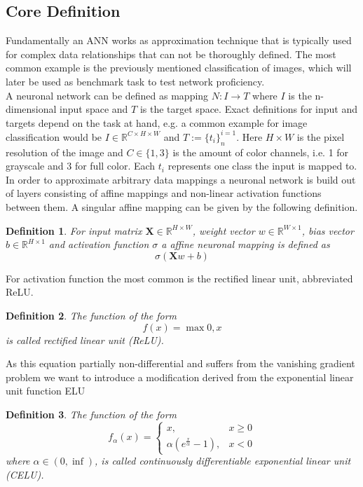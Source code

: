 \documentclass[a4paper,12pt,titlepage,enabledeprecatedfontcommands]{scrreprt}
\newtheorem{definition}{Definition}[chapter]
\begin{document}
\subsection{Core Definition}
Fundamentally an ANN works as approximation technique that is typically used for complex data relationships that can not be thoroughly defined. The most common example is the previously mentioned classification of images, which will later be used as benchmark task to test network proficiency. \\
A neuronal network can be defined as mapping $N: I \rightarrow T$ where $I$ is the n-dimensional input space and $T$ is the target space. Exact definitions for input and targets depend on the task at hand, e.g. a common example for image classification would be $I \in \mathbb{R}^{C \times H \times W}$ and $T := {\{t_i\}}^{i=1}_{n}$. Here $H \times W$ is the pixel resolution of the image and $C \in \{1,3\}$ is the amount of color channels, i.e. 1 for grayscale and 3 for full color. Each $t_i$ represents one class the input is mapped to. \\
In order to approximate arbitrary data mappings a neuronal network is build out of layers consisting of affine mappings and non-linear activation functions between them. A singular affine mapping can be given by the following definition.  \\
\begin{definition}
For input matrix $\bm{X} \in \mathbb{R}^{H\times W}$, weight vector $w \in \mathbb{R}^{W\times 1}$, bias vector $b \in \mathbb{R}^{H \times 1}$ and activation function $\sigma$ a affine neuronal mapping is defined as
\begin{equation}
\sigma (\bm{X}w+b)
\end{equation}
\end{definition}
For activation function the most common is the rectified linear unit, abbreviated ReLU. \\
\begin{definition}
The function of the form
\begin{equation}
f(x) = \max{0,x}
\end{equation}
is called rectified linear unit (ReLU).
\end{definition}
As this equation partially non-differential and suffers from the vanishing gradient problem we want to introduce a modification derived from the exponential linear unit function ELU
\begin{definition}
The function of the form
\begin{equation}
f_{\alpha}(x) = \begin{cases}
				x, &x\geq0 \\
				\alpha(e^{\frac{x}{\alpha}} - 1), &x < 0
				\end{cases}
\end{equation}
where $\alpha \in (0,\inf)$, is called continuously differentiable exponential linear unit (CELU).
\end{definition}
\end{document}
